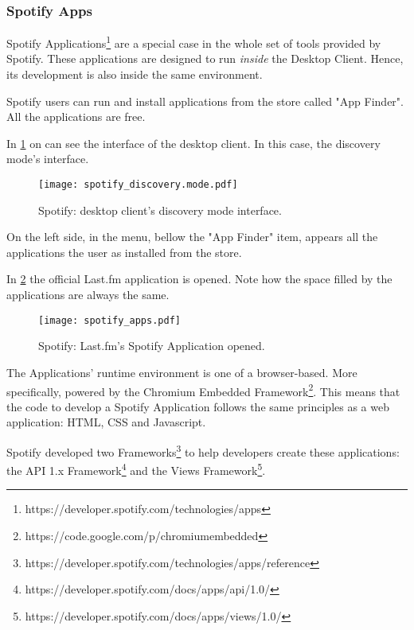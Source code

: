     \subsubsection{Spotify Apps} %
    \label{ssub:spotify_apps}
      Spotify Applications\footnote{https://developer.spotify.com/technologies/apps} are a special case in the whole set of tools provided by Spotify.
      These applications are designed to run \emph{inside} the Desktop Client.
      Hence, its development is also inside the same environment.

      Spotify users can run and install applications from the store called "App Finder".
      All the applications are free.

      In \ref{fig:spotify_apps} on can see the interface of the desktop client.
      In this case, the discovery mode's interface.

      \begin{figure}
        \begin{center}
          \texttt{[image: spotify\_discovery.mode.pdf]}
        \end{center}
        \caption{Spotify: desktop client's discovery mode interface.}
        \label{fig:spotify_apps}
      \end{figure}

      On the left side, in the menu, bellow the "App Finder" item, appears all the applications the user as installed from the store.

      In \ref{fig:spotify_apps2} the official Last.fm application is opened.
      Note how the space filled by the applications are always the same.

      \begin{figure}
        \begin{center}
          \texttt{[image: spotify\_apps.pdf]}
        \end{center}
        \caption{Spotify: Last.fm's Spotify Application opened.}
        \label{fig:spotify_apps2}
      \end{figure}

      The Applications' runtime environment is one of a browser-based.
      More specifically, powered by the Chromium Embedded Framework\footnote{https://code.google.com/p/chromiumembedded}.
      This means that the code to develop a Spotify Application follows the same principles as a web application: HTML, CSS and Javascript.

      Spotify developed two Frameworks\footnote{https://developer.spotify.com/technologies/apps/reference} to help developers create these applications: the API 1.x Framework\footnote{https://developer.spotify.com/docs/apps/api/1.0/} and the Views Framework\footnote{https://developer.spotify.com/docs/apps/views/1.0/}.

